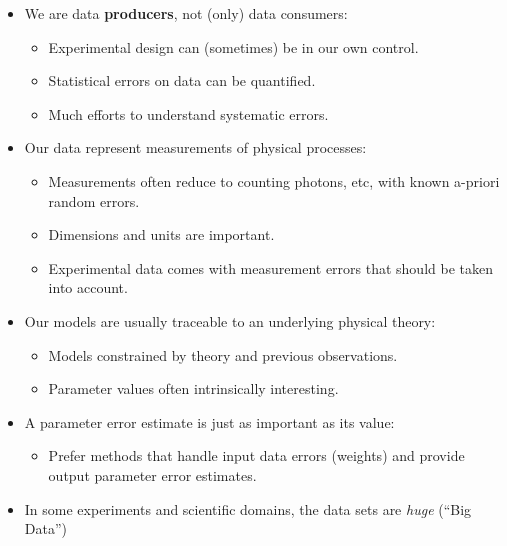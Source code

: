 \documentclass[%
oneside,                 %
final,                   %
10pt]{article}
\begin{document}
\begin{itemize}
  \item We are data \textbf{producers}, not (only) data consumers:
\begin{itemize}

    \item Experimental design can (sometimes) be in our own control.

    \item Statistical errors on data can be quantified.

    \item Much efforts to understand systematic errors.

\end{itemize}

\noindent
  \item Our data represent measurements of physical processes:
\begin{itemize}

    \item Measurements often reduce to counting photons, etc, with known a-priori random errors.

    \item Dimensions and units are important.

    \item Experimental data comes with measurement errors that should be taken into account.

\end{itemize}

\noindent
  \item Our models are usually traceable to an underlying physical theory:
\begin{itemize}

    \item Models constrained by theory and previous observations.

    \item Parameter values often intrinsically interesting.

\end{itemize}

\noindent
  \item A parameter error estimate is just as important as its value:
\begin{itemize}

    \item Prefer methods that handle input data errors (weights) and provide output parameter error estimates.

\end{itemize}

\noindent
  \item In some experiments and scientific domains, the data sets are \emph{huge} (``Big Data'')
\end{itemize}
\end{document}
